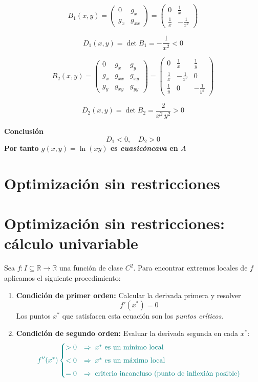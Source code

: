 \documentclass{article}
\begin{document}
\[
B_1(x,y)
=\begin{pmatrix}
0 & g_x\\[4pt]
g_x & g_{xx}
\end{pmatrix}
=
\begin{pmatrix}
0 & \tfrac1x\\[4pt]
\tfrac1x & -\tfrac1{x^2}
\end{pmatrix}
\]

\[
D_1(x,y)=\det B_1=-\frac1{x^2}<0
\]

\[
B_2(x,y)
=\begin{pmatrix}
0      & g_x       & g_y\\[4pt]
g_x    & g_{xx}    & g_{xy}\\[4pt]
g_y    & g_{xy}    & g_{yy}
\end{pmatrix}
=
\begin{pmatrix}
0      & \tfrac1x       & \tfrac1y\\[4pt]
\tfrac1x & -\tfrac1{x^2} & 0\\[4pt]
\tfrac1y & 0             & -\tfrac1{y^2}
\end{pmatrix}
\]

\[
D_2(x,y)=\det B_2=\frac{2}{x^2\,y^2}>0
\]

\noindent\textbf{Conclusión}\\
\[
D_1<0,\quad D_2>0
\]
\textbf{\color{teal}Por tanto \(g(x,y)=\ln(xy)\) es \emph{cuasicóncava} en \(A\)}








\newpage
\section{Optimización sin restricciones}


\section*{Optimización sin restricciones: cálculo univariable}

Sea \(f\colon I\subseteq\mathbb{R}\to\mathbb{R}\) una función de clase \(C^2\).  
Para encontrar extremos locales de \(f\) aplicamos el siguiente procedimiento:

\begin{enumerate}
  \item \textbf{Condición de primer orden:}  
    Calcular la derivada primera y resolver
    \[
      f'(x^*) = 0
    \]
    Los puntos \(x^*\) que satisfacen esta ecuación son los \emph{puntos críticos}.

  \item \textbf{Condición de segundo orden:}  
    Evaluar la derivada segunda en cada \(x^*\):
    \[\color{teal}
      f''(x^*) \begin{cases}
        >0 & \Rightarrow\;x^*\text{ es un mínimo local}\\[4pt]
        <0 & \Rightarrow\;x^*\text{ es un máximo local}\\[4pt]
        =0 & \Rightarrow\;\text{criterio inconcluso (punto de inflexión posible)}
      \end{cases}
    \]
\end{enumerate}
\end{document}
